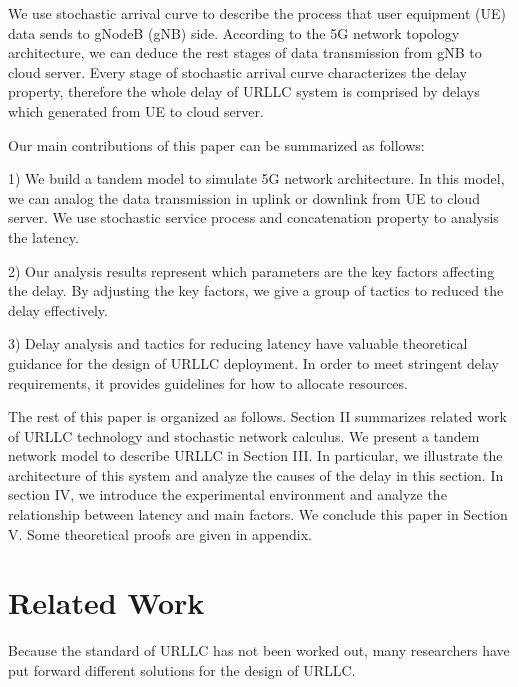 \documentclass[runningheads]{llncs}
\begin{document}
We use stochastic arrival curve to describe the process that user equipment (UE) data sends to gNodeB (gNB) side.
According to the 5G network topology architecture, we can deduce the rest stages of data transmission from gNB to cloud server.
Every stage of stochastic arrival curve characterizes the delay property, therefore the whole delay of URLLC system is comprised by delays which generated from UE to cloud server.

Our main contributions of this paper can be summarized as follows:

1) We build a tandem model to simulate 5G network architecture. In this model, we can analog the data transmission in uplink or downlink from UE to cloud server. We use stochastic service process and concatenation property to analysis the latency.

2) Our analysis results represent which parameters are the key factors affecting the delay. By adjusting the key factors, we give a group of tactics to reduced the delay effectively.

3) Delay analysis and tactics for reducing latency have valuable theoretical guidance for the design of URLLC deployment. In order to meet stringent delay requirements, it provides guidelines for how to allocate resources.

The rest of this paper is organized as follows.
Section II summarizes related work of URLLC technology and stochastic network calculus.
We present a tandem network model to describe URLLC in Section III.
In particular, we illustrate the architecture of this system and analyze the causes of the delay in this section.
In section IV, we introduce the experimental environment and analyze the relationship between latency and main factors.
We conclude this paper in Section V.
Some theoretical proofs are given in appendix.

\section{Related Work}
Because the standard of URLLC has not been worked out, many researchers have put forward different solutions for the design of URLLC.
\end{document}
